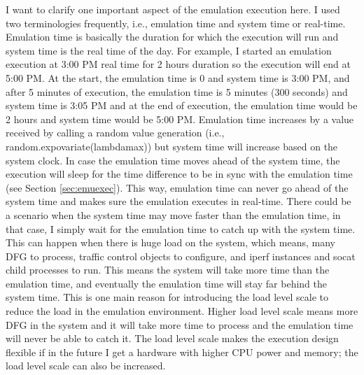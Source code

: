 I want to clarify one important aspect of the emulation execution here. I used two terminologies frequently, i.e., emulation time and system time or real-time. Emulation time is basically the duration for which the execution will run and system time is the real time of the day. For example, I started an emulation execution at 3:00 PM real time for 2 hours duration so the execution will end at 5:00 PM. At the start, the emulation time is 0 and system time is 3:00 PM, and after 5 minutes of execution, the emulation time is 5 minutes (300 seconds) and system time is 3:05 PM and at the end of execution, the emulation time would be 2 hours and system time would be 5:00 PM. Emulation time increases by a value received by calling a random value generation (i.e., random.expovariate(lambdamax)) but system time will increase based on the system clock. In case the emulation time moves ahead of the system time, the execution will sleep for the time difference to be in sync with the emulation time (see Section \ref{sec:emuexec}). This way, emulation time can never go ahead of the system time and makes sure the emulation executes in real-time. There could be a scenario when the system time may move faster than the emulation time, in that case, I simply wait for the emulation time to catch up with the system time. This can happen when there is huge load on the system, which means, many DFG to process, traffic control objects to configure, and iperf instances and socat child processes to run. This means the system will take more time than the emulation time, and eventually the emulation time will stay far behind the system time. This is one main reason for introducing the load level scale to reduce the load in the emulation environment. Higher load level scale means more DFG in the system and it will take more time to process and the emulation time will never be able to catch it. The load level scale makes the execution design flexible if in the future I get a hardware with higher CPU power and memory; the load level scale can also be increased.

